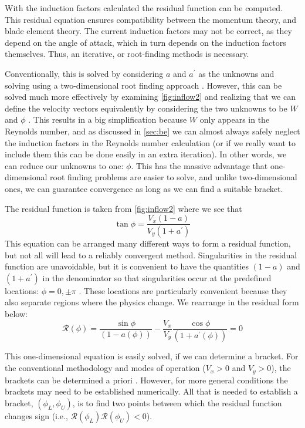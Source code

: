 \documentclass{article}
\begin{document}
With the induction factors calculated the residual function can be computed. This residual equation ensures compatibility between the momentum theory, and blade element theory. The current induction factors may not be correct, as they depend on the angle of attack, which in turn depends on the induction factors themselves.  Thus, an iterative, or root-finding methods is necessary.

Conventionally, this is solved by considering $a$ and $a^\prime$ as the unknowns and solving using a two-dimensional root finding approach \cite{Manwell2009-Wind-Energy,Hansen2008-Aerodynamics-Wind,Burton2011-Wind-Energy}.  However, this can be solved much more effectively by examining \cref{fig:inflow2} and realizing that we can define the velocity vectors equivalently by considering the two unknowns to be $W$ and $\phi$ \cite{Ning2014-Simple-Solution}.  This results in a big simplification because $W$ only appears in the Reynolds number, and as discussed in \cref{sec:be} we can almost always safely neglect the induction factors in the Reynolds number calculation (or if we really want to include them this can be done easily in an extra iteration). In other words, we can reduce our unknowns to one: $\phi$.  This has the massive advantage that one-dimensional root finding problems are easier to solve, and unlike two-dimensional ones, we can guarantee convergence as long as we can find a suitable bracket.

The residual function is taken from \cref{fig:inflow2} where we see that
\[\tan\phi = \frac{V_x (1 - a)}{V_y (1 + a^\prime)}\]
This equation can be arranged many different ways to form a residual function, but not all will lead to a reliably convergent method. Singularities in the residual function are unavoidable, but it is convenient to have the quantities $(1 - a)$ and $(1 + a^\prime)$ in the denominator so that singularities occur at the predefined locations: $\phi = 0, \pm\pi$ \cite{Ning2014-Simple-Solution}. These locations are particularly convenient because they also separate regions where the physics change.  We rearrange in the residual form below:
\begin{equation}
    \mathcal{R}(\phi) = \frac{\sin\phi}{(1 - a(\phi))} - \frac{V_x}{V_y} \frac{\cos\phi}{(1 + a^\prime(\phi))} = 0
    \label{eq:residual}
\end{equation}

This one-dimensional equation is easily solved, if we can determine a bracket.  For the conventional methodology and modes of operation ($V_x > 0$ and $V_y > 0$), the brackets can be determined a priori \cite{Ning2014-Simple-Solution}.  However, for more general conditions the brackets may need to be established numerically.  All that is needed to establish a bracket, $(\phi_L, \phi_U)$, is to find two points between which the residual function changes sign (i.e., $\mathcal{R}(\phi_L)\mathcal{R}(\phi_U) < 0$).
\end{document}
